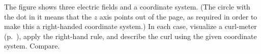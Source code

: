 The figure shows three electric fields and a coordinate system.
(The circle with the dot in it means that the $z$ axis points out of
the page, as required in order to make this a right-handed coordinate system.) 
In each case, visualize a curl-meter (p.~\pageref{fig:curlmeter-fac}), apply the right-hand rule,
and describe the curl using the given coordinate
system. Compare.


